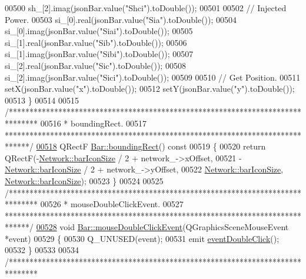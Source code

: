 \begin{DoxyCode}
00500   sh\_[2].imag(jsonBar.value(\textcolor{stringliteral}{"Shci"}).toDouble());
00501 
00502   \textcolor{comment}{// Injected Power.}
00503   si\_[0].real(jsonBar.value(\textcolor{stringliteral}{"Sia"}).toDouble());
00504   si\_[0].imag(jsonBar.value(\textcolor{stringliteral}{"Siai"}).toDouble());
00505   si\_[1].real(jsonBar.value(\textcolor{stringliteral}{"Sib"}).toDouble());
00506   si\_[1].imag(jsonBar.value(\textcolor{stringliteral}{"Sibi"}).toDouble());
00507   si\_[2].real(jsonBar.value(\textcolor{stringliteral}{"Sic"}).toDouble());
00508   si\_[2].imag(jsonBar.value(\textcolor{stringliteral}{"Sici"}).toDouble());
00509 
00510   \textcolor{comment}{// Get Position.}
00511   setX(jsonBar.value(\textcolor{stringliteral}{"x"}).toDouble());
00512   setY(jsonBar.value(\textcolor{stringliteral}{"y"}).toDouble());
00513 \}
00514 
00515 \textcolor{comment}{/*******************************************************************************}
00516 \textcolor{comment}{ * boundingRect.}
00517 \textcolor{comment}{ ******************************************************************************/}
\hypertarget{bar_8cpp_source_l00518}{}\hyperlink{group___models_ga8279d8109019cc7e139e2023690496be}{00518} QRectF \hyperlink{group___models_ga8279d8109019cc7e139e2023690496be}{Bar::boundingRect}()\textcolor{keyword}{ const}
00519 \textcolor{keyword}{}\{
00520   \textcolor{keywordflow}{return} QRectF(-\hyperlink{group___models_gaa334bbc93b3fde219840e95e23198b53}{Network::barIconSize} / 2 + network\_->xOffset,
00521                 -\hyperlink{group___models_gaa334bbc93b3fde219840e95e23198b53}{Network::barIconSize} / 2 + network\_->yOffset,
00522                 \hyperlink{group___models_gaa334bbc93b3fde219840e95e23198b53}{Network::barIconSize}, \hyperlink{group___models_gaa334bbc93b3fde219840e95e23198b53}{Network::barIconSize});
00523 \}
00524 
00525 \textcolor{comment}{/*******************************************************************************}
00526 \textcolor{comment}{ * mouseDoubleClickEvent.}
00527 \textcolor{comment}{ ******************************************************************************/}
\hypertarget{bar_8cpp_source_l00528}{}\hyperlink{group___models_ga1945e7b4401fa9ad7475274d9fb12a72}{00528} \textcolor{keywordtype}{void} \hyperlink{group___models_ga1945e7b4401fa9ad7475274d9fb12a72}{Bar::mouseDoubleClickEvent}(QGraphicsSceneMouseEvent *event)
00529 \{
00530   Q\_UNUSED(event);
00531   emit \hyperlink{class_bar_a66bcbd19582dddee7e171ae5a4475f4b}{eventDoubleClick}();
00532 \}
00533 
00534 \textcolor{comment}{/*******************************************************************************}

\end{DoxyCode}
